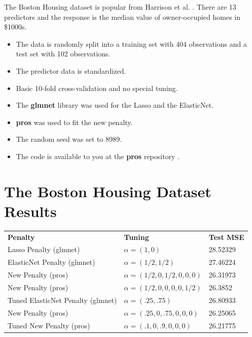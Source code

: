 \documentclass[10pt, reqno]{article}
\numberwithin{equation}{section}
\begin{document}
The Boston Housing dataset is popular from Harrison et al. \cite{boston_housing}.
There are 13 predictors and the response is the median value of owner-occupied homes in \$1000s.

\begin{itemize}
\item The data is randomly split into a training set with 404 observations and a test set with 102 observations.

\item The predictor data is standardized.

\item Basic 10-fold cross-validation and no special tuning.

\item The \textbf{glmnet} \cite{glmnet} library was used for the Lasso and the ElasticNet.

\item \textbf{pros} \cite{pros} was used to fit the new penalty.

\item The random seed was set to 8989.

\item The code is available to you at the \textbf{pros} repository \cite{pros}.
\end{itemize}

\newpage
\section*{The Boston Housing Dataset Results}

\begin{center}
\begingroup
\setlength{\tabcolsep}{6pt} %
\renewcommand{\arraystretch}{2} %
\begin{tabular}{ l l l}
\textbf{Penalty} & \textbf{Tuning} & \textbf{Test MSE} \\
Lasso Penalty (glmnet) & $\alpha = (1, 0)$ & 28.52329 \\

ElasticNet Penalty (glmnet) & $\alpha = (1/2, 1/2)$  & 27.46224   \\

New Penalty (pros) & $\alpha = (1/2, 0, 1/2, 0, 0, 0)$ & 26.31973 \\

New Penalty (pros) & $\alpha = (1/2, 0, 0, 0, 0, 1/2)$ & 26.3852 \\

Tuned ElasticNet Penalty (glmnet) & $\alpha = (.25, .75)$  & 26.80933   \\

New Penalty (pros) & $\alpha = (.25, 0, .75, 0, 0, 0)$ & 26.25065 \\

Tuned New Penalty (pros) & $\alpha = (.1, 0, .9, 0, 0, 0)$ & 26.21775 \\
\end{tabular}
\endgroup
\end{center}
\end{document}
